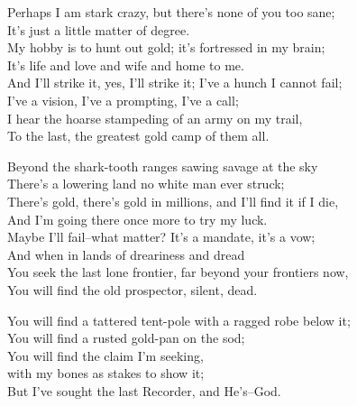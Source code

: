 \begin{poemblock}
Perhaps I am stark crazy, but there's none of you too sane;\\
\idt It's just a little matter of degree.\\
My hobby is to hunt out gold; it's fortressed in my brain;\\
\idt It's life and love and wife and home to me.\\
And I'll strike it, yes, I'll strike it; I've a hunch I cannot fail;\\
\idt I've a vision, I've a prompting, I've a call;\\
I hear the hoarse stampeding of an army on my trail,\\
\idt To the last, the greatest gold camp of them all.

Beyond the shark-tooth ranges sawing savage at the sky\\
\idt There's a lowering land no white man ever struck;\\
There's gold, there's gold in millions, and I'll find it if I die,\\
\idt And I'm going there once more to try my luck.\\
Maybe I'll fail--what matter?  It's a mandate, it's a vow;\\
\idt And when in lands of dreariness and dread\\
You seek the last lone frontier, far beyond your frontiers now,\\
\idt You will find the old prospector, silent, dead.

You will find a tattered tent-pole with a ragged robe below it;\\
\idt You will find a rusted gold-pan on the sod;\\
You will find the claim I'm seeking,\\
\idt with my bones as stakes to show it;\\
But I've sought the last Recorder, and He's--God.
\end{poemblock}
